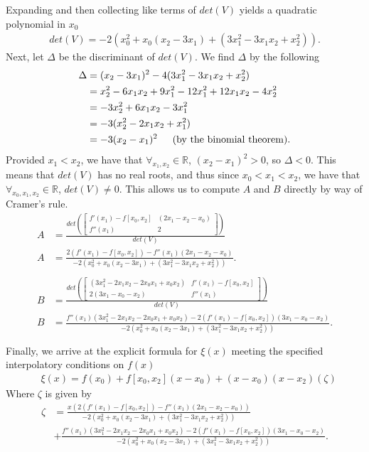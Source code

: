 \documentclass[11pt, letterpaper]{article}
\begin{document}
Expanding and then collecting like terms of $det(V)$ yields a quadratic polynomial in $x_0$
\begin{align*}
    det(V)=-2(x_0^2+x_0(x_2-3x_1)+(3x_1^2-3x_1x_2+x_2^2)).
\end{align*}
Next, let $\Delta$ be the discriminant of $det(V)$. We find $\Delta$ by the following
\begin{align*}
    \Delta&=(x_2-3x_1)^2-4(3x_1^2-3x_1x_2+x_2^2)\\
    &=x_2^2-6x_1x_2+9x_1^2-12x_1^2+12x_1x_2-4x_2^2\\
    &=-3x_2^2+6x_1x_2-3x_1^2\\
    &=-3(x_2^2-2x_1x_2+x_1^2)\\
    &=-3(x_2-x_1)^2\text{\indent (by the binomial theorem).}
\end{align*}
Provided $x_1<x_2$, we have that $\forall_{x_1,x_2}\in\mathbb{R}$, $(x_2-x_1)^2>0$, so $\Delta<0$. This means that 
$det(V)$ has no real roots, and thus since $x_0<x_1<x_2$, we have that $\forall_{x_0,x_1,x_2}\in\mathbb{R}$, $det(V)\neq0$. 
This allows us to compute $A$ and $B$ directly by way of Cramer's rule.
\begin{align*}
    A&=\frac{det\left(\begin{bmatrix}
    f'(x_1)-f[x_0,x_2] & (2x_1-x_2-x_0)\\
    f''(x_1) & 2\end{bmatrix}   
    \right)}{det(V)}\\
    A&=\frac{2(f'(x_1)-f[x_0,x_2])-f''(x_1)(2x_1-x_2-x_0)}{-2(x_0^2+x_0(x_2-3x_1)+(3x_1^2-3x_1x_2+x_2^2))}.\\\\
    B&=\frac{det\left(\begin{bmatrix}
    (3x_1^2-2x_1x_2-2x_0x_1+x_0x_2) & f'(x_1)-f[x_0,x_2]\\
    2(3x_1-x_0-x_2) & f''(x_1)\end{bmatrix}   
    \right)}{det(V)}\\
    B&=\frac{f''(x_1)(3x_1^2-2x_1x_2-2x_0x_1+x_0x_2)-2(f'(x_1)-f[x_0,x_2])(3x_1-x_0-x_2)}{-2(x_0^2+x_0(x_2-3x_1)+(3x_1^2-3x_1x_2+x_2^2))}.\\\\
\end{align*}
Finally, we arrive at the explicit formula for $\xi(x)$ meeting the specified interpolatory conditions on $f(x)$
\begin{align*}
    &\xi(x)=f(x_0)+f[x_0,x_2](x-x_0)+(x-x_0)(x-x_2)(\zeta)
\end{align*}
Where $\zeta$ is given by
\begin{align*}
    \zeta&=\frac{x(2(f'(x_1)-f[x_0,x_2])-f''(x_1)(2x_1-x_2-x_0))}{-2(x_0^2+x_0(x_2-3x_1)+(3x_1^2-3x_1x_2+x_2^2))}\\
    &+\frac{f''(x_1)(3x_1^2-2x_1x_2-2x_0x_1+x_0x_2)-2(f'(x_1)-f[x_0,x_2])(3x_1-x_0-x_2)}{-2(x_0^2+x_0(x_2-3x_1)+(3x_1^2-3x_1x_2+x_2^2))}.
\end{align*}
\end{document}
